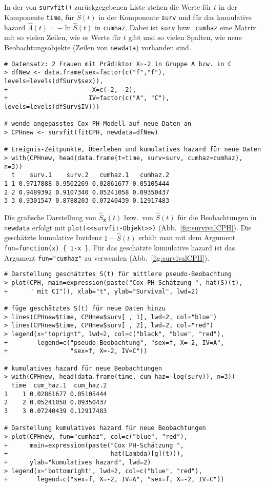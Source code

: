 In der von \lstinline!survfit()! zurückgegebenen Liste stehen die Werte für $t$ in der Komponente \lstinline!time!, für $\hat{S}(t)$ in der Komponente \lstinline!surv! und für das kumulative hazard $\hat{\Lambda}(t) = -\ln \hat{S}(t)$ in \lstinline!cumhaz!. Dabei ist \lstinline!surv! bzw.\ \lstinline!cumhaz! eine Matrix mit so vielen Zeilen, wie es Werte für $t$ gibt und so vielen Spalten, wie neue Beobachtungsobjekte (Zeilen von \lstinline!newdata!) vorhanden sind.
\begin{lstlisting}
# Datensatz: 2 Frauen mit Prädiktor X=-2 in Gruppe A bzw. in C
> dfNew <- data.frame(sex=factor(c("f","f"), levels=levels(dfSurv$sex)),
+                       X=c(-2, -2),
+                      IV=factor(c("A", "C"), levels=levels(dfSurv$IV)))

# wende angepasstes Cox PH-Modell auf neue Daten an
> CPHnew <- survfit(fitCPH, newdata=dfNew)

# Ereignis-Zeitpunkte, Überleben und kumulatives hazard für neue Daten
> with(CPHnew, head(data.frame(t=time, surv=surv, cumhaz=cumhaz), n=3))
  t    surv.1    surv.2   cumhaz.1   cumhaz.2
1 1 0.9717888 0.9502269 0.02861677 0.05105444
2 2 0.9489392 0.9107340 0.05241058 0.09350437
3 3 0.9301547 0.8788203 0.07240439 0.12917483
\end{lstlisting}

Die grafische Darstellung von $\hat{S}_{\overline{\bm{x}}}(t)$ bzw.\ von $\hat{S}(t)$ für die Beobachtungen in \lstinline!newdata! erfolgt mit \lstinline!plot(<<survfit-Objekt>>)! (Abb.\ \ref{fig:survivalCPH}). Die geschätzte kumulative Inzidenz $1-\hat{S}(t)$ erhält man mit dem Argument \lstinline!fun=function(x) { 1-x }!. Für das geschätzte kumulative hazard ist das Argument \lstinline!fun="cumhaz"! zu verwenden (Abb.\ \ref{fig:survivalCPH}).
\begin{lstlisting}
# Darstellung geschätztes S(t) für mittlere pseudo-Beobachtung
> plot(CPH, main=expression(paste("Cox PH-Schätzung ", hat(S)(t),
+      " mit CI")), xlab="t", ylab="Survival", lwd=2)

# füge geschätztes S(t) für neue Daten hinzu
> lines(CPHnew$time, CPHnew$surv[ , 1], lwd=2, col="blue")
> lines(CPHnew$time, CPHnew$surv[ , 2], lwd=2, col="red")
> legend(x="topright", lwd=2, col=c("black", "blue", "red"),
+        legend=c("pseudo-Beobachtung", "sex=f, X=-2, IV=A",
+                 "sex=f, X=-2, IV=C"))

# kumulatives hazard für neue Beobachtungen
> with(CPHnew, head(data.frame(time, cum_haz=-log(surv)), n=3))
  time  cum_haz.1  cum_haz.2
1    1 0.02861677 0.05105444
2    2 0.05241058 0.09350437
3    3 0.07240439 0.12917483

# Darstellung kumulatives hazard für neue Beobachtungen
> plot(CPHnew, fun="cumhaz", col=c("blue", "red"),
+      main=expression(paste("Cox PH-Schätzung ",
+                            hat(Lambda)[g](t))),
+      ylab="kumulatives hazard", lwd=2)
> legend(x="bottomright", lwd=2, col=c("blue", "red"),
+        legend=c("sex=f, X=-2, IV=A", "sex=f, X=-2, IV=C"))
\end{lstlisting}

